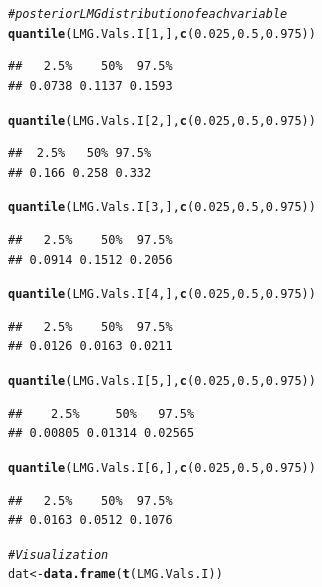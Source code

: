 \documentclass[11pt,a4paper,twoside]{book}
\makeatletter
\newcommand{\hlnum}[1]{\textcolor[rgb]{0.686,0.059,0.569}{#1}}%
\newcommand{\hlcom}[1]{\textcolor[rgb]{0.678,0.584,0.686}{\textit{#1}}}%
\newcommand{\hlstd}[1]{\textcolor[rgb]{0.345,0.345,0.345}{#1}}%
\newcommand{\hlkwb}[1]{\textcolor[rgb]{0.69,0.353,0.396}{#1}}%
\newcommand{\hlkwd}[1]{\textcolor[rgb]{0.737,0.353,0.396}{\textbf{#1}}}%
\newenvironment{kframe}{%
 \def\at@end@of@kframe{}%
 \ifinner\ifhmode%
  \def\at@end@of@kframe{\end{minipage}}%
  \begin{minipage}{\columnwidth}%
 \fi\fi%
 \def\FrameCommand##1{\hskip\@totalleftmargin \hskip-\fboxsep
 \colorbox{shadecolor}{##1}\hskip-\fboxsep
     \hskip-\linewidth \hskip-\@totalleftmargin \hskip\columnwidth}%
 \MakeFramed {\advance\hsize-\width
   \@totalleftmargin\z@ \linewidth\hsize
   \@setminipage}}%
 {\par\unskip\endMakeFramed%
 \at@end@of@kframe}
\newenvironment{knitrout}{}{} %
\makeatother
\begin{document}
\begin{knitrout}
\begin{kframe}
\begin{alltt}
\hlcom{# posterior LMG distribution of each variable}
\hlkwd{quantile}\hlstd{(LMG.Vals.I[}\hlnum{1}\hlstd{,],} \hlkwd{c}\hlstd{(}\hlnum{0.025}\hlstd{,} \hlnum{0.5}\hlstd{,} \hlnum{0.975}\hlstd{))}
\end{alltt}
\begin{verbatim}
##   2.5%    50%  97.5% 
## 0.0738 0.1137 0.1593
\end{verbatim}
\begin{alltt}
\hlkwd{quantile}\hlstd{(LMG.Vals.I[}\hlnum{2}\hlstd{,],} \hlkwd{c}\hlstd{(}\hlnum{0.025}\hlstd{,} \hlnum{0.5}\hlstd{,} \hlnum{0.975}\hlstd{))}
\end{alltt}
\begin{verbatim}
##  2.5%   50% 97.5% 
## 0.166 0.258 0.332
\end{verbatim}
\begin{alltt}
\hlkwd{quantile}\hlstd{(LMG.Vals.I[}\hlnum{3}\hlstd{,],} \hlkwd{c}\hlstd{(}\hlnum{0.025}\hlstd{,} \hlnum{0.5}\hlstd{,} \hlnum{0.975}\hlstd{))}
\end{alltt}
\begin{verbatim}
##   2.5%    50%  97.5% 
## 0.0914 0.1512 0.2056
\end{verbatim}
\begin{alltt}
\hlkwd{quantile}\hlstd{(LMG.Vals.I[}\hlnum{4}\hlstd{,],} \hlkwd{c}\hlstd{(}\hlnum{0.025}\hlstd{,} \hlnum{0.5}\hlstd{,} \hlnum{0.975}\hlstd{))}
\end{alltt}
\begin{verbatim}
##   2.5%    50%  97.5% 
## 0.0126 0.0163 0.0211
\end{verbatim}
\begin{alltt}
\hlkwd{quantile}\hlstd{(LMG.Vals.I[}\hlnum{5}\hlstd{,],} \hlkwd{c}\hlstd{(}\hlnum{0.025}\hlstd{,} \hlnum{0.5}\hlstd{,} \hlnum{0.975}\hlstd{))}
\end{alltt}
\begin{verbatim}
##    2.5%     50%   97.5% 
## 0.00805 0.01314 0.02565
\end{verbatim}
\begin{alltt}
\hlkwd{quantile}\hlstd{(LMG.Vals.I[}\hlnum{6}\hlstd{,],} \hlkwd{c}\hlstd{(}\hlnum{0.025}\hlstd{,} \hlnum{0.5}\hlstd{,} \hlnum{0.975}\hlstd{))}
\end{alltt}
\begin{verbatim}
##   2.5%    50%  97.5% 
## 0.0163 0.0512 0.1076
\end{verbatim}
\begin{alltt}
\hlcom{#Visualization}
\hlstd{dat} \hlkwb{<-} \hlkwd{data.frame}\hlstd{(}\hlkwd{t}\hlstd{(LMG.Vals.I))}


\end{alltt}
\end{kframe}
\end{knitrout}
\end{document}
